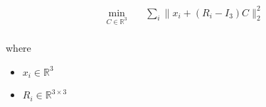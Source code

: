 \documentclass[12pt]{article}
\begin{document}
\[
\begin{aligned} \min_{\textit{C} \in \mathbb{R}^{ 3}} \quad & \sum_\textit{i} \|\textit{x}_{ \textit{i} } + (\textit{R}_{ \textit{i} } - I_{ 3 })\textit{C}\|_2^{2} \\
\end{aligned}
\]

where
\begin{itemize}
\item $\textit{x}_{\textit{i}} \in \mathbb{R}^{ 3}$
\item $\textit{R}_{\textit{i}} \in \mathbb{R}^{ 3 \times 3 }$
\end{itemize}
\end{document}

